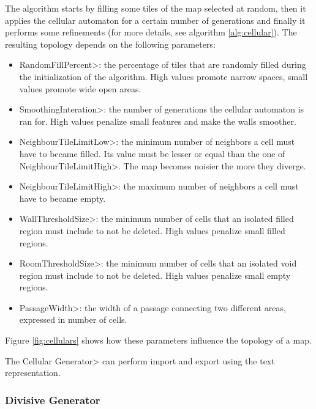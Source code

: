 \par

The algorithm starts by filling some tiles of the map selected at random, then it applies the cellular automaton for a certain number of generations and finally it performs some refinements (for more details, see algorithm \ref{alg:cellular}). The resulting topology depends on the following parameters:

\begin{itemize}
\item \<RandomFillPercent>: the percentage of tiles that are randomly filled during the initialization of the algorithm. High values promote narrow spaces, small values promote wide open areas.
\item \<SmoothingInteration>: the number of generations the cellular automaton is ran for. High values penalize small features and make the walls smoother. 
\item \<NeighbourTileLimitLow>: the minimum number of neighbors a cell must have to became filled. Its value must be lesser or equal than the one of \<NeighbourTileLimitHigh>. The map becomes noisier the more they diverge.
\item \<NeighbourTileLimitHigh>: the maximum number of neighbors a cell must have to became empty.
\item \<WallThresholdSize>: the minimum number of cells that an isolated filled region must include to not be deleted. High values penalize small filled regions.
\item \<RoomThresholdSize>: the minimum number of cells that an isolated void region must include to not be deleted. High values penalize small empty regions.
\item \<PassageWidth>: the width of a passage connecting two different areas, expressed in number of cells.
\end{itemize}

\noindent Figure \ref{fig:cellulars} shows how these parameters influence the topology of a map.

\par

The \<Cellular Generator> can perform import and export using the text representation.


\subsubsection{Divisive Generator}\label{sssec:digger}

